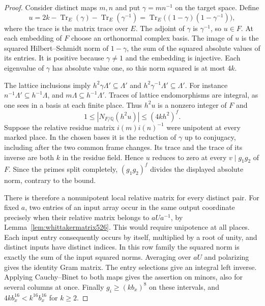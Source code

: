 \documentclass[a4paper,11pt]{article}
\theoremstyle{definition}
\theoremstyle{remark}
\numberwithin{equation}{section}
\begin{document}
\begin{proof}
Consider distinct maps \(m,n\) and put \(\gamma=mn^{-1}\) on the
target space. Define
\[
        u=2k-\operatorname{Tr}_E(\gamma)
                  -\operatorname{Tr}_E(\gamma^{-1})
          =\operatorname{Tr}_E\big((1-\gamma)(1-\gamma^{-1})\big),
\]
where the trace is the matrix trace over \(E\). The adjoint of
\(\gamma\) is \(\gamma^{-1}\), so \(u\in F\). At each embedding
of \(F\) choose an orthonormal complex basis. The image of \(u\)
is the squared Hilbert--Schmidt norm of \(1-\gamma\), the sum of
the squared absolute values of its entries. It is positive because
\(\gamma\ne1\) and the embedding is injective. Each eigenvalue of
\(\gamma\) has absolute value one, so this norm squared is at
most \(4k\).

The lattice inclusions imply \(h^2\gamma\Lambda'\subseteq\Lambda'\)
and \(h^2\gamma^{-1}\Lambda'\subseteq\Lambda'\). For instance
\(n^{-1}\Lambda'\subseteq h^{-1}\Lambda\), and
\(m\Lambda\subseteq h^{-1}\Lambda'\). Traces of lattice
endomorphisms are integral, as one sees in a basis at each finite
place. Thus \(h^2u\) is a nonzero integer of \(F\) and
\[
            1\le |N_{F/\mathbb Q}(h^2u)|\le(4kh^2)^f .
\]
Suppose the relative residue matrix \(i(m)i(n)^{-1}\) were
unipotent at every marked place. In the chosen bases it is the
reduction of \(\gamma\) up to conjugacy, including after the
two common frame changes. Its trace and the trace of its inverse
are both \(k\) in the residue field. Hence \(u\) reduces to zero
at every \(v\mid g_1g_2\) of \(F\). Since the primes split
completely, \((g_1g_2)^f\) divides the displayed absolute norm,
contrary to the bound.

There is therefore a nonunipotent local relative matrix for
every distinct pair. For fixed \(a\), two entries of an input
array occur in the same output coordinate precisely when their
relative matrix belongs to \(aUa^{-1}\), by
Lemma~\ref{lem:whittakermatrix526}. This would require unipotence
at all places. Each input entry consequently occurs by itself,
multiplied by a root of unity, and distinct inputs have distinct
indices. In this row family the squared norm is exactly the sum
of the input squared norms. Averaging over \(aU\) and polarizing
gives the identity Gram matrix. The entry selections give an
integral left inverse. Applying Cauchy--Binet to both maps gives
the assertion on minors, also for several columns at once.
Finally \(g_i\ge(kb_x)^8\) on these intervals, and
\(4k b_x^{16}<k^{16}b_x^{16}\) for \(k\ge2\).
\end{proof}
\end{document}
